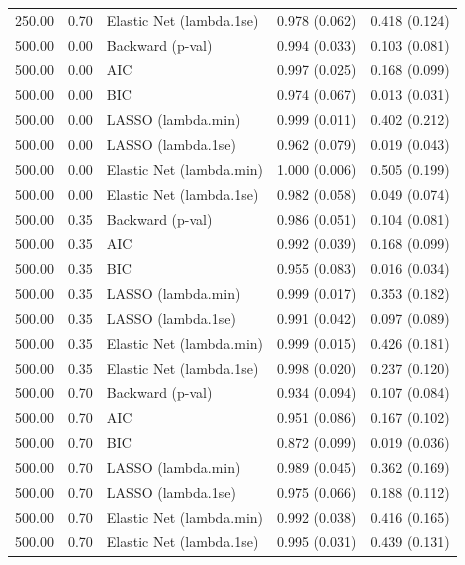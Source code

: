 \begin{table}[ht]
\begin{tabular}{rrlll}
  250.00 & 0.70 & Elastic Net (lambda.1se) & 0.978 (0.062) & 0.418 (0.124) \\ 
  500.00 & 0.00 & Backward (p-val) & 0.994 (0.033) & 0.103 (0.081) \\ 
  500.00 & 0.00 & AIC & 0.997 (0.025) & 0.168 (0.099) \\ 
  500.00 & 0.00 & BIC & 0.974 (0.067) & 0.013 (0.031) \\ 
  500.00 & 0.00 & LASSO (lambda.min) & 0.999 (0.011) & 0.402 (0.212) \\ 
  500.00 & 0.00 & LASSO (lambda.1se) & 0.962 (0.079) & 0.019 (0.043) \\ 
  500.00 & 0.00 & Elastic Net (lambda.min) & 1.000 (0.006) & 0.505 (0.199) \\ 
  500.00 & 0.00 & Elastic Net (lambda.1se) & 0.982 (0.058) & 0.049 (0.074) \\ 
  500.00 & 0.35 & Backward (p-val) & 0.986 (0.051) & 0.104 (0.081) \\ 
  500.00 & 0.35 & AIC & 0.992 (0.039) & 0.168 (0.099) \\ 
  500.00 & 0.35 & BIC & 0.955 (0.083) & 0.016 (0.034) \\ 
  500.00 & 0.35 & LASSO (lambda.min) & 0.999 (0.017) & 0.353 (0.182) \\ 
  500.00 & 0.35 & LASSO (lambda.1se) & 0.991 (0.042) & 0.097 (0.089) \\ 
  500.00 & 0.35 & Elastic Net (lambda.min) & 0.999 (0.015) & 0.426 (0.181) \\ 
  500.00 & 0.35 & Elastic Net (lambda.1se) & 0.998 (0.020) & 0.237 (0.120) \\ 
  500.00 & 0.70 & Backward (p-val) & 0.934 (0.094) & 0.107 (0.084) \\ 
  500.00 & 0.70 & AIC & 0.951 (0.086) & 0.167 (0.102) \\ 
  500.00 & 0.70 & BIC & 0.872 (0.099) & 0.019 (0.036) \\ 
  500.00 & 0.70 & LASSO (lambda.min) & 0.989 (0.045) & 0.362 (0.169) \\ 
  500.00 & 0.70 & LASSO (lambda.1se) & 0.975 (0.066) & 0.188 (0.112) \\ 
  500.00 & 0.70 & Elastic Net (lambda.min) & 0.992 (0.038) & 0.416 (0.165) \\ 
  500.00 & 0.70 & Elastic Net (lambda.1se) & 0.995 (0.031) & 0.439 (0.131) \\ 
   \bottomrule
\end{tabular}
\end{table}

